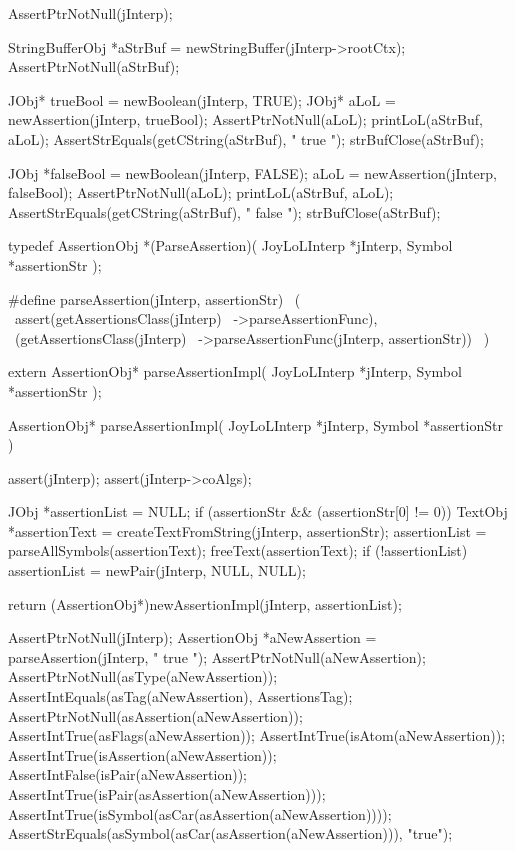 \startCTest
  AssertPtrNotNull(jInterp);

  StringBufferObj *aStrBuf = newStringBuffer(jInterp->rootCtx);
  AssertPtrNotNull(aStrBuf);

  JObj* trueBool = newBoolean(jInterp,   TRUE);
  JObj* aLoL     = newAssertion(jInterp, trueBool);
  AssertPtrNotNull(aLoL);
  printLoL(aStrBuf, aLoL);
  AssertStrEquals(getCString(aStrBuf), "{ true } ");
  strBufClose(aStrBuf);

  JObj *falseBool = newBoolean(jInterp,   FALSE);
  aLoL            = newAssertion(jInterp, falseBool);
  AssertPtrNotNull(aLoL);
  printLoL(aStrBuf, aLoL);
  AssertStrEquals(getCString(aStrBuf), "{ false } ");
  strBufClose(aStrBuf);
\stopCTest
\stopTestCase
\stopTestSuite

\startTestSuite[parseAssertion]

\startCHeader
typedef AssertionObj *(ParseAssertion)(
  JoyLoLInterp *jInterp,
  Symbol       *assertionStr
);

#define parseAssertion(jInterp, assertionStr)       \
  (                                                 \
    assert(getAssertionsClass(jInterp)              \
      ->parseAssertionFunc),                        \
    (getAssertionsClass(jInterp)                    \
      ->parseAssertionFunc(jInterp, assertionStr))  \
  )
\stopCHeader

\setCHeaderStream{private}
\startCHeader
extern AssertionObj* parseAssertionImpl(
  JoyLoLInterp *jInterp,
  Symbol       *assertionStr
);
\stopCHeader
{}

\startCCode
AssertionObj* parseAssertionImpl(
  JoyLoLInterp *jInterp,
  Symbol       *assertionStr
) {
  assert(jInterp);
  assert(jInterp->coAlgs);
  
  JObj *assertionList = NULL;
  if (assertionStr && (assertionStr[0] != 0)) {
    TextObj *assertionText = createTextFromString(jInterp, assertionStr);
    assertionList = parseAllSymbols(assertionText);
    freeText(assertionText);
  }
  if (!assertionList) assertionList = newPair(jInterp, NULL, NULL);

  return (AssertionObj*)newAssertionImpl(jInterp, assertionList);
}
\stopCCode

\startTestCase[should parse an assertion]
\startCTest
  AssertPtrNotNull(jInterp);
  AssertionObj *aNewAssertion = parseAssertion(jInterp, " true ");
  AssertPtrNotNull(aNewAssertion);
  AssertPtrNotNull(asType(aNewAssertion));
  AssertIntEquals(asTag(aNewAssertion), AssertionsTag);
  AssertPtrNotNull(asAssertion(aNewAssertion));
  AssertIntTrue(asFlags(aNewAssertion));
  AssertIntTrue(isAtom(aNewAssertion));
  AssertIntTrue(isAssertion(aNewAssertion));
  AssertIntFalse(isPair(aNewAssertion));  
  AssertIntTrue(isPair(asAssertion(aNewAssertion)));
  AssertIntTrue(isSymbol(asCar(asAssertion(aNewAssertion))));
  AssertStrEquals(asSymbol(asCar(asAssertion(aNewAssertion))), "true");
\stopCTest
\stopTestCase
\stopTestSuite

